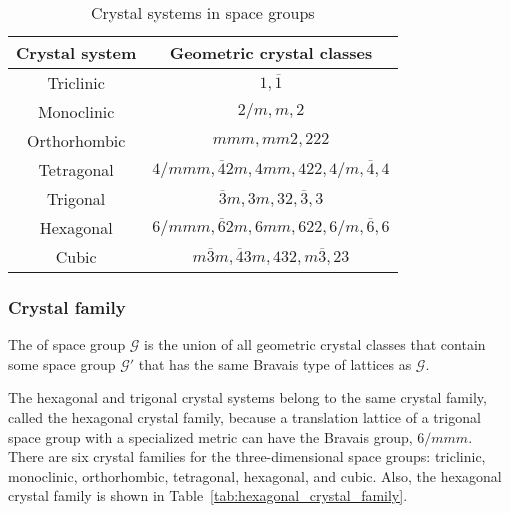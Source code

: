 \begin{table}[htb]
  \centering
  \caption{Crystal systems in space groups}
  \label{tab:crystal_system}
  \begin{tabular}{cc}
    \hline\hline
    Crystal system & Geometric crystal classes                                \\ \hline
    Triclinic      & $1, \overline{1}$                                        \\
    Monoclinic     & $2/m, m, 2$                                              \\
    Orthorhombic   & $mmm, mm2, 222$                                          \\
    Tetragonal     & $4/mmm, \overline{4}2m, 4mm, 422, 4/m, \overline{4}, 4$  \\
    Trigonal       & $\overline{3}m, 3m, 32, \overline{3}, 3$                 \\
    Hexagonal      & $6/mmm, \overline{6}2m, 6mm, 622, 6/m, \overline{6}, 6$  \\
    Cubic          & $m\overline{3}m, \overline{4}3m, 432, m\overline{3}, 23$ \\
    \hline\hline
  \end{tabular}
\end{table}

\subsubsection{\label{sec:crystal-family}Crystal family}

\begin{screen}
  \begin{defn}
    The  of space group $\mathcal{G}$ is the union of all geometric crystal classes that contain some space group $\mathcal{G}'$ that has the same Bravais type of lattices as $\mathcal{G}$.
  \end{defn}
\end{screen}

The hexagonal and trigonal crystal systems belong to the same crystal family, called the hexagonal crystal family, because a translation lattice of a trigonal space group with a specialized metric can have the Bravais group, $6/mmm$.
There are six crystal families for the three-dimensional space groups: triclinic, monoclinic, orthorhombic, tetragonal, hexagonal, and cubic.
Also, the hexagonal crystal family is shown in Table~\ref{tab:hexagonal_crystal_family}.


